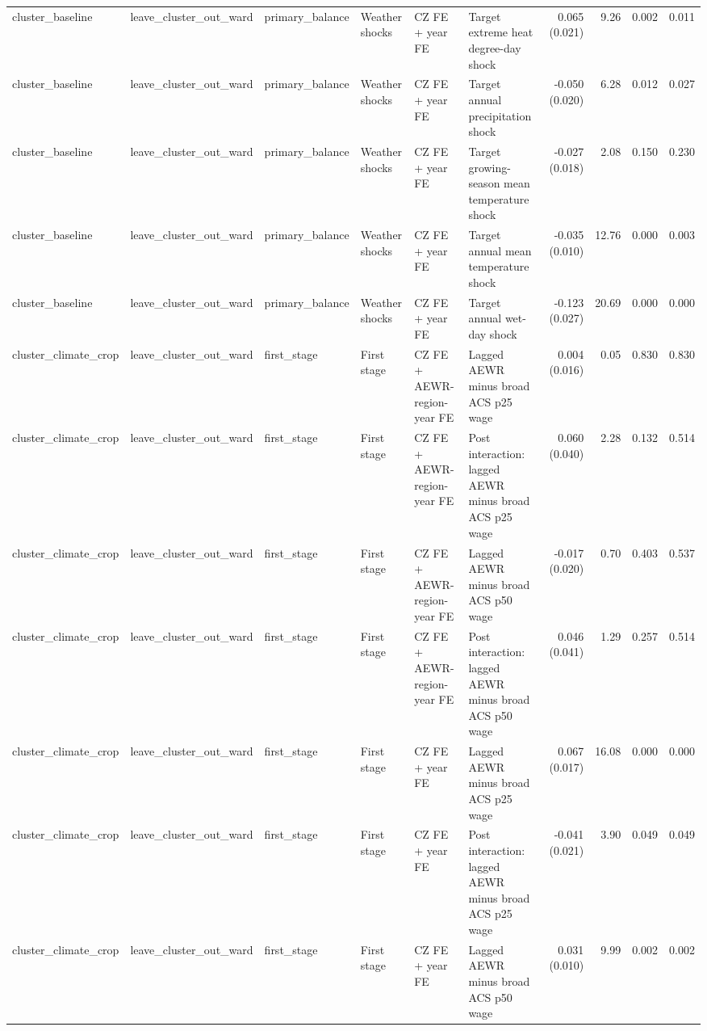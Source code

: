 \begin{tabular}{llllllrrrr}
cluster_baseline & leave_cluster_out_ward & primary_balance & Weather shocks & CZ FE + year FE & Target extreme heat degree-day shock & 0.065 (0.021) & 9.26 & 0.002 & 0.011 \\
cluster_baseline & leave_cluster_out_ward & primary_balance & Weather shocks & CZ FE + year FE & Target annual precipitation shock & -0.050 (0.020) & 6.28 & 0.012 & 0.027 \\
cluster_baseline & leave_cluster_out_ward & primary_balance & Weather shocks & CZ FE + year FE & Target growing-season mean temperature shock & -0.027 (0.018) & 2.08 & 0.150 & 0.230 \\
cluster_baseline & leave_cluster_out_ward & primary_balance & Weather shocks & CZ FE + year FE & Target annual mean temperature shock & -0.035 (0.010) & 12.76 & 0.000 & 0.003 \\
cluster_baseline & leave_cluster_out_ward & primary_balance & Weather shocks & CZ FE + year FE & Target annual wet-day shock & -0.123 (0.027) & 20.69 & 0.000 & 0.000 \\
cluster_climate_crop & leave_cluster_out_ward & first_stage & First stage & CZ FE + AEWR-region-year FE & Lagged AEWR minus broad ACS p25 wage & 0.004 (0.016) & 0.05 & 0.830 & 0.830 \\
cluster_climate_crop & leave_cluster_out_ward & first_stage & First stage & CZ FE + AEWR-region-year FE & Post interaction: lagged AEWR minus broad ACS p25 wage & 0.060 (0.040) & 2.28 & 0.132 & 0.514 \\
cluster_climate_crop & leave_cluster_out_ward & first_stage & First stage & CZ FE + AEWR-region-year FE & Lagged AEWR minus broad ACS p50 wage & -0.017 (0.020) & 0.70 & 0.403 & 0.537 \\
cluster_climate_crop & leave_cluster_out_ward & first_stage & First stage & CZ FE + AEWR-region-year FE & Post interaction: lagged AEWR minus broad ACS p50 wage & 0.046 (0.041) & 1.29 & 0.257 & 0.514 \\
cluster_climate_crop & leave_cluster_out_ward & first_stage & First stage & CZ FE + year FE & Lagged AEWR minus broad ACS p25 wage & 0.067 (0.017) & 16.08 & 0.000 & 0.000 \\
cluster_climate_crop & leave_cluster_out_ward & first_stage & First stage & CZ FE + year FE & Post interaction: lagged AEWR minus broad ACS p25 wage & -0.041 (0.021) & 3.90 & 0.049 & 0.049 \\
cluster_climate_crop & leave_cluster_out_ward & first_stage & First stage & CZ FE + year FE & Lagged AEWR minus broad ACS p50 wage & 0.031 (0.010) & 9.99 & 0.002 & 0.002 \\

\end{tabular}
